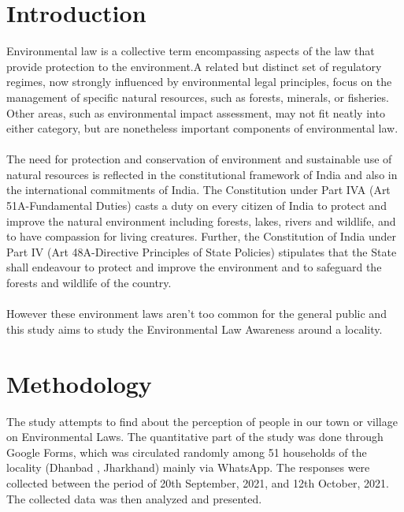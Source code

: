 \documentclass[12pt]{article}
\begin{document}

\newpage

\newpage

\newpage
\section{ Introduction }
Environmental law is a collective term encompassing aspects of the law that provide protection to the environment.A related but distinct set of regulatory regimes, now strongly influenced by environmental legal principles, focus on the management of specific natural resources, such as forests, minerals, or fisheries. Other areas, such as environmental impact assessment, may not fit neatly into either category, but are nonetheless important components of environmental law.
\\ \\
The need for protection and conservation of environment and sustainable use of natural resources is reflected in the constitutional framework of India and also in the international commitments of India. The Constitution under Part IVA (Art 51A-Fundamental Duties) casts a duty on every citizen of India to protect and improve the natural environment including forests, lakes, rivers and wildlife, and to have compassion for living creatures. Further, the Constitution of India under Part IV (Art 48A-Directive Principles of State Policies) stipulates that the State shall endeavour to protect and improve the environment and to safeguard the forests and wildlife of the country.
\\ \\
However these environment laws aren't too common for the general public and this study aims to study the Environmental Law Awareness around a locality. 

\section{Methodology}
The study attempts to find about  the perception of people in our town or village 
on Environmental Laws. The  quantitative  part  of  the  study  was  done  through 
Google  Forms,  which  was  circulated  randomly  among 51 households of  the  locality (Dhanbad , Jharkhand) 
mainly  via  WhatsApp. The  responses  were  collected  between  the  period  of  20th 
September,  2021,  and  12th  October,  2021.  The  collected  data  was  then 
analyzed and presented. 

\newpage
\end{document}
